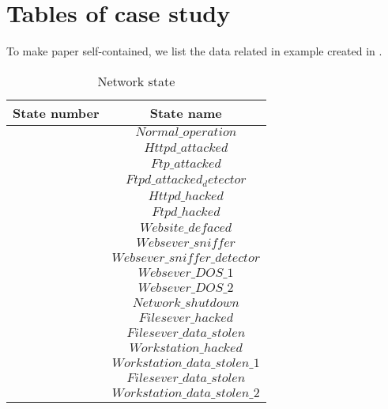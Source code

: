 \documentclass{acm_proc_article-sp}
\begin{document}
\section{Tables of case study}
To make paper self-contained, we list the data related in example created in \cite{klye}.
\newcommand{\Rown}{\stepcounter{Rownumber}\theRownumber}
\begin{table}[htbp]
\scriptsize
\centering
\begin{tabular}{cc}\hline
State number & State name\\\hline
\Rown        & $Normal\_operation$\\
\Rown        & $Httpd\_attacked$\\
\Rown        & $Ftp\_attacked$\\
\Rown        & $Ftpd\_attacked_detector$\\
\Rown        & $Httpd\_hacked$\\
\Rown        & $Ftpd\_hacked$\\
\Rown        & $Website\_defaced$\\
\Rown        & $Websever\_sniffer$\\
\Rown        & $Websever\_sniffer\_detector$\\
\Rown        & $Websever\_DOS\_1$\\
\Rown        & $Websever\_DOS\_2$\\
\Rown        & $Network\_shutdown$\\
\Rown        & $Filesever\_hacked$\\
\Rown        & $Filesever\_data\_stolen$\\
\Rown        & $Workstation\_hacked$\\
\Rown        & $Workstation\_data\_stolen\_1$\\
\Rown        & $Filesever\_data\_stolen$\\
\Rown        & $Workstation\_data\_stolen\_2$\\
\hline
\end{tabular}
\caption{\label{state}Network state}
\end{table}
\end{document}
